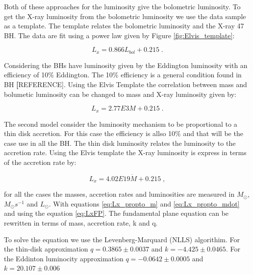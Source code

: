 Both of these approaches for the luminosity give the bolometric
luminosity. To get the X-ray luminosity from the bolometric luminosity
we use the \citet{elvis1994atlasof} data sample as a template.  The
template relates the bolometric luminosity and the X-ray 47 BH. The data are fit using a power
law given by Figure \ref{fig:Elvis_template}:

\begin{equation}
L_{x}=0.866L_{bol}+0.215\;.
\end{equation}

Considering the BHs have luminosity given by the Eddington luminosity with an efficiency of 10\% Eddington.  The 10\% efficiency is a general condition found in BH \textbf[{REFERENCE]}.  Using the Elvis Template the correlation between mass and bolumetic luminosity can be changed to mass and X-ray luminosity given by:

\begin{equation}
L_{x}=2.77E3M+ 0.215 \;.\label{eq:Lx_propto_m}
\end{equation}

The second model consider the luminosity mechanism to be proportional
to a thin disk accretion. For this case the efficiency is allso  10\% and that will be the case use in all the BH.  The thin disk luminosity relates the luminosity to the accretion rate.  Using the Elvis template the X-ray luminosity is express in terms of the accretion rate by:

\begin{equation}
L_{x}=4.02E19\dot{M}+ 0.215  \;,\label{eq:Lx_propto_mdot}
\end{equation}

for all the cases the masses, accretion rates and luminosities are
measured in $M_{\odot}$, $M_{\odot}s^{-1}$ and $L_{\odot}$. With
equations \ref{eq:Lx_propto_m} and \ref{eq:Lx_propto_mdot} and using
the equation \ref{eq:LxFP}. The fundamental plane equation can be
rewritten in terms of mass, accretion rate, k and q. 

To solve the equation we use the Levenberg-Marquard (NLLS)
algorithim.  For the thin-disk approximation $q = 0.3865\pm 0.0037$ and
$k = -4.425\pm 0.0465$.  For the Eddinton luminocity approximation $q = -0.0642\pm 0.0005$ and
$k = 20.107\pm 0.006$


